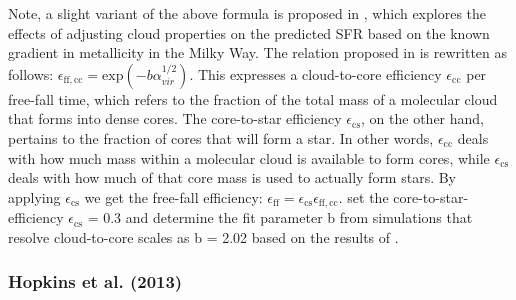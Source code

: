 \documentclass{aa}
\begin{document}
Note, a slight variant of the above formula is proposed in \cite{Evans_2022}, which explores the effects of adjusting cloud properties on the predicted SFR based on the known gradient in metallicity in the Milky Way. The relation proposed in \cite{Padoan_2012} is rewritten as follows: $\epsilon_{\mathrm{ff, cc}}=\mathrm{exp}\left(-b\alpha_{vir}^{1/2}\right)$.
This expresses a cloud-to-core efficiency  $\epsilon_{\mathrm{cc}}$ per free-fall time, which refers to the fraction of the total mass of a molecular cloud that forms into dense cores. The core-to-star efficiency  $\epsilon_{\mathrm{cs}}$, on the other hand, pertains to the fraction of cores that will form a star. In other words,  $\epsilon_{\mathrm{cc}}$ deals with how much mass within a molecular cloud is available to form cores, while $\epsilon_{\mathrm{cs}}$ deals with how much of that core mass is used to actually form stars. By applying $\epsilon_{\mathrm{cs}}$ we get the free-fall efficiency: 
$\epsilon_{\mathrm{ff}} = \epsilon_{\mathrm{cs}} \epsilon_{\mathrm{ff, cc}}$.
\cite{Evans_2022} set the core-to-star-efficiency $\epsilon_{\mathrm{cs}}$ = 0.3 and determine the fit parameter b from simulations that resolve cloud-to-core scales as b = 2.02 based on the results of \cite{Kim_2021}.
    
\subsubsection{Hopkins et al. (2013)}
\end{document}
